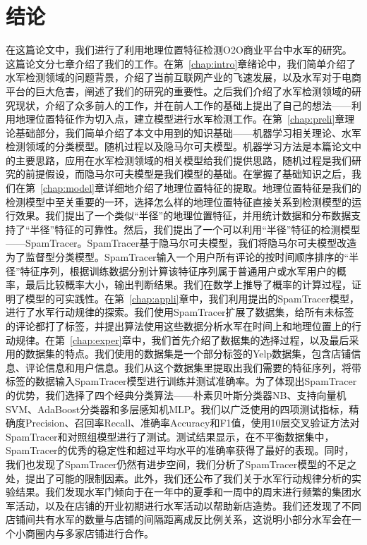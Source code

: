 
\chapter{结论}
\label{chap:concl}


在这篇论文中，我们进行了利用地理位置特征检测O2O商业平台中水军的研究。这篇论文分七章介绍了我们的工作。在第~\ref{chap:intro}章绪论中，我们简单介绍了水军检测领域的问题背景，介绍了当前互联网产业的飞速发展，以及水军对于电商平台的巨大危害，阐述了我们的研究的重要性。之后我们介绍了水军检测领域的研究现状，介绍了众多前人的工作，并在前人工作的基础上提出了自己的想法——利用地理位置特征作为切入点，建立模型进行水军检测工作。在第~\ref{chap:preli}章理论基础部分，我们简单介绍了本文中用到的知识基础——机器学习相关理论、水军检测领域的分类模型。随机过程以及隐马尔可夫模型。机器学习方法是本篇论文中的主要思路，应用在水军检测领域的相关模型给我们提供思路，随机过程是我们研究的前提假设，而隐马尔可夫模型是我们模型的基础。在掌握了基础知识之后，我们在第~\ref{chap:model}章详细地介绍了地理位置特征的提取。地理位置特征是我们的检测模型中至关重要的一环，选择怎么样的地理位置特征直接关系到检测模型的运行效果。我们提出了一个类似“半径”的地理位置特征，并用统计数据和分布数据支持了“半径”特征的可靠性。然后，我们提出了一个可以利用“半径”特征的检测模型——SpamTracer。SpamTracer基于隐马尔可夫模型，我们将隐马尔可夫模型改造为了监督型分类模型。SpamTracer输入一个用户所有评论的按时间顺序排序的“半径”特征序列，根据训练数据分别计算该特征序列属于普通用户或水军用户的概率，最后比较概率大小，输出判断结果。我们在数学上推导了概率的计算过程，证明了模型的可实践性。在第~\ref{chap:appli}章中，我们利用提出的SpamTracer模型，进行了水军行动规律的探索。我们使用SpamTracer扩展了数据集，给所有未标签的评论都打了标签，并提出算法使用这些数据分析水军在时间上和地理位置上的行动规律。在第~\ref{chap:exper}章中，我们首先介绍了数据集的选择过程，以及最后采用的数据集的特点。我们使用的数据集是一个部分标签的Yelp数据集，包含店铺信息、评论信息和用户信息。我们从这个数据集里提取出我们需要的特征序列，将带标签的数据输入SpamTracer模型进行训练并测试准确率。为了体现出SpamTracer的优势，我们选择了四个经典分类算法——朴素贝叶斯分类器NB、支持向量机SVM、AdaBoost分类器和多层感知机MLP。我们以广泛使用的四项测试指标，精确度Precision、召回率Recall、准确率Accuracy和F1值，使用10层交叉验证方法对SpamTracer和对照组模型进行了测试。测试结果显示，在不平衡数据集中，SpamTracer的优秀的稳定性和超过平均水平的准确率获得了最好的表现。同时，我们也发现了SpamTracer仍然有进步空间，我们分析了SpamTracer模型的不足之处，提出了可能的限制因素。此外，我们还公布了我们关于水军行动规律分析的实验结果。我们发现水军门倾向于在一年中的夏季和一周中的周末进行频繁的集团水军活动，以及在店铺的开业初期进行水军活动以帮助新店造势。我们还发现了不同店铺间共有水军的数量与店铺的间隔距离成反比例关系，这说明小部分水军会在一个小商圈内与多家店铺进行合作。
